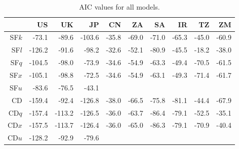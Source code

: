 \documentclass[preprint,authoryear,12pt]{elsarticle}\usepackage{graphicx, color}
\begin{document}
\begin{table}[ht]
\begin{center}
\caption{AIC values for all models.}
\label{tab:AICTable}
\begin{tabular}{rrrrrrrrrr}
  \hline
 & US & UK & JP & CN & ZA & SA & IR & TZ & ZM \\ 
  \hline
SF$k$ & -73.1 & -89.6 & -103.6 & -35.8 & -69.0 & -71.0 & -65.3 & -45.0 & -60.9 \\ 
  SF$l$ & -126.2 & -91.6 & -98.2 & -32.6 & -52.1 & -80.9 & -45.5 & -18.2 & -38.0 \\ 
  SF$q$ & -104.5 & -98.0 & -73.9 & -34.6 & -54.9 & -63.3 & -49.4 & -70.5 & -61.5 \\ 
  SF$x$ & -105.1 & -98.8 & -72.5 & -34.6 & -54.9 & -63.1 & -49.3 & -71.4 & -61.7 \\ 
  SF$u$ & -83.6 & -76.5 & -43.1 &  &  &  &  &  &  \\ 
  CD & -159.4 & -92.4 & -126.8 & -38.0 & -66.5 & -75.8 & -81.1 & -44.4 & -67.9 \\ 
  CD$q$ & -157.4 & -113.2 & -126.5 & -36.0 & -63.7 & -86.4 & -79.1 & -52.5 & -35.1 \\ 
  CD$x$ & -157.5 & -113.7 & -126.4 & -36.0 & -65.0 & -86.3 & -79.1 & -70.9 & -40.4 \\ 
  CD$u$ & -128.2 & -92.9 & -79.6 &  &  &  &  &  &  \\ 
   \hline
\end{tabular}
\end{center}
\end{table}
\end{document}
